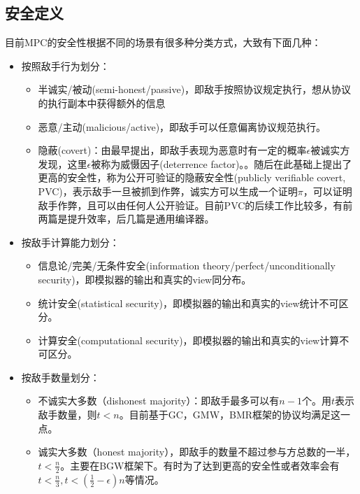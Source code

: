 \documentclass[UTF8]{ctexart}
\theoremstyle{nonumberplain}
\theoremstyle{plain}
\begin{document}
\subsection{安全定义}

目前MPC的安全性根据不同的场景有很多种分类方式，大致有下面几种：
\begin{itemize}
\item 按照敌手行为划分：
\begin{itemize}
\item 半诚实/被动(semi-honest/passive)，即敌手按照协议规定执行，想从协议的执行副本中获得额外的信息
\item 恶意/主动(malicious/active)，即敌手可以任意偏离协议规范执行。
\item 隐蔽(covert)：由\cite{DBLP:conf/tcc/AumannL07}最早提出，即敌手表现为恶意时有一定的概率$\epsilon$被诚实方发现，这里$\epsilon$被称为威慑因子(deterrence factor)。{}。随后\cite{DBLP:conf/asiacrypt/AsharovO12}在此基础上提出了更高的安全性，称为公开可验证的隐蔽安全性(publicly verifiable covert, PVC)，表示敌手一旦被抓到作弊，诚实方可以生成一个证明$\pi$，可以证明敌手作弊，且可以由任何人公开验证。目前PVC的后续工作比较多，有\cite{DBLP:conf/asiacrypt/KolesnikovM15,DBLP:conf/eurocrypt/HongKKLW19,DBLP:conf/crypto/DamgardO020,DBLP:conf/eurocrypt/FaustHKS21,DBLP:journals/iacr/Scholl0S21}前两篇是提升效率，后几篇是通用编译器。
\end{itemize}
\item 按敌手计算能力划分：
\begin{itemize}
\item 信息论/完美/无条件安全(information theory/perfect/unconditionally security)，即模拟器的输出和真实的view同分布。
\item 统计安全(statistical security)，即模拟器的输出和真实的view统计不可区分。
\item 计算安全(computational security)，即模拟器的输出和真实的view计算不可区分。
\end{itemize}
\item 按敌手数量划分：
\begin{itemize}
\item 不诚实大多数（dishonest majority）：即敌手最多可以有$n-1$个。用$t$表示敌手数量，则$t<n$。目前基于GC，GMW，BMR框架的协议均满足这一点。{}
\item 诚实大多数（honest majority），即敌手的数量不超过参与方总数的一半，$t<\frac{n}{2}$。主要在BGW框架下。有时为了达到更高的安全性或者效率会有$t<\frac{n}{3},t<(\frac{1}{2}-\epsilon)n$等情况。

\end{itemize}
\end{itemize}
\end{document}
